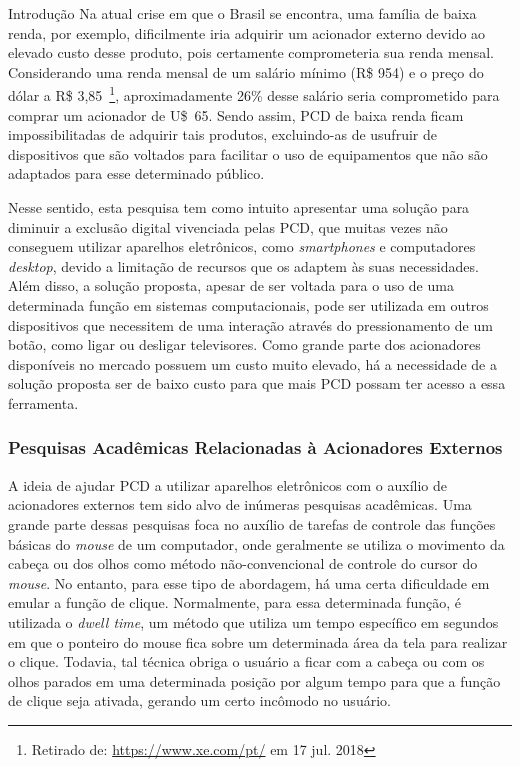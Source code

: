 \begin{chapter}{Introdução}
Na atual crise em que o Brasil se encontra, uma família de baixa renda, por
exemplo, dificilmente iria adquirir um acionador externo devido ao elevado custo
desse produto, pois certamente comprometeria sua renda mensal.  Considerando uma
renda mensal de um salário mínimo  (R\$ 954) e o preço do dólar a R\$
3,85~\footnote{Retirado de: \url{https://www.xe.com/pt/} em 17 jul. 2018},
aproximadamente 26\% desse salário seria comprometido para comprar um acionador
de U\$~65. Sendo assim, PCD de baixa renda ficam impossibilitadas de adquirir
tais produtos, excluindo-as de usufruir de dispositivos que são voltados para
facilitar o uso de equipamentos que não são adaptados para esse determinado
público. %

Nesse sentido, esta pesquisa tem como intuito apresentar uma solução para
diminuir a exclusão digital vivenciada pelas PCD, que muitas vezes não conseguem
utilizar aparelhos eletrônicos, como \textit{smartphones} e computadores
\textit{desktop}, devido a limitação de recursos que os adaptem às suas
necessidades. Além disso, a solução proposta, apesar de ser voltada para o uso de
uma determinada função em sistemas computacionais, pode ser utilizada em outros
dispositivos que necessitem de uma interação através do pressionamento de um
botão, como ligar ou desligar televisores. Como grande parte dos acionadores
disponíveis no mercado possuem um custo muito elevado, há a necessidade de a
solução proposta ser de baixo custo para que mais PCD possam ter
acesso a essa ferramenta. 

 
\subsubsection {Pesquisas Acadêmicas Relacionadas à Acionadores Externos}

A ideia de ajudar PCD a utilizar aparelhos eletrônicos com o auxílio de
acionadores externos tem sido alvo de inúmeras pesquisas acadêmicas. Uma grande
parte dessas pesquisas foca no auxílio de tarefas de controle das funções
básicas do \textit{mouse} de um computador, onde geralmente se utiliza o
movimento da cabeça ou dos olhos como método não-convencional de controle do
cursor do \textit{mouse}. No entanto, para esse tipo de abordagem, há uma certa
dificuldade em emular a função de clique.  Normalmente, para essa determinada
função,  é utilizada o \textit{dwell time}, um método que utiliza um tempo
específico em segundos em que o ponteiro do mouse fica sobre um determinada área
da tela para realizar  o clique. Todavia, tal técnica obriga o usuário a ficar
com a cabeça ou com os olhos parados em uma determinada posição por algum tempo
para que a função de clique seja ativada, gerando um certo incômodo no usuário.


\end{chapter}
